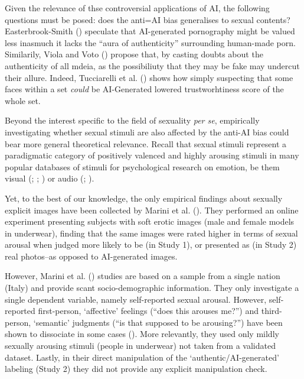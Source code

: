 \documentclass[
  jou,
  floatsintext,
  longtable,
  nolmodern,
  notxfonts,
  notimes,
  colorlinks=true,linkcolor=blue,citecolor=blue,urlcolor=blue]{apa7}
\begin{document}
Given the relevance of thse controversial applications of AI, the
following questions must be posed: does the anti=AI bias generalises to
sexual contents? Easterbrook-Smith
() speculate that
AI-generated pornography might be valued less inasmuch it lacks the
``aura of authenticity'' surrounding human-made porn. Similarily, Viola
and Voto () propose that, by
casting doubts about the authenticity of all mdeia, as the possibiliuty
that they may be fake may undercut their allure. Indeed, Tucciarelli et
al. () shows how simply
suspecting that some faces within a set \emph{could} be AI-Generated
lowered trustworhtiness score of the whole set.

Beyond the interest specific to the field of sexuality \emph{per se},
empirically investigating whether sexual stimuli are also affected by
the anti-AI bias could bear more general theoretical relevance. Recall
that sexual stimuli represent a paradigmatic category of positively
valenced and highly arousing stimuli in many popular databases of
stimuli for psychological research on emotion, be them visual
(;
;
) or audio
(;
).

Yet, to the best of our knowledge, the only empirical findings about
sexually explicit images have been collected by Marini et al.
(). They performed an online
experiment presenting subjects with soft erotic images (male and female
models in underwear), finding that the same images were rated higher in
terms of sexual arousal when judged more likely to be (in Study 1), or
presented as (in Study 2) real photos--as opposed to AI-generated
images.

However, Marini et al. () studies are
based on a sample from a single nation (Italy) and provide scant
socio-demographic information. They only investigate a single dependent
variable, namely self-reported sexual arousal. However, self-reported
first-person, `affective' feelings (``does this arouses me?'') and
third-person, `semantic' judgments (``is that supposed to be
arousing?'') have been shown to dissociate in some cases
(). More
relevantly, they used only mildly sexually arousing stimuli (people in
underwear) not taken from a validated dataset. Lastly, in their direct
manipulation of the `authentic/AI-generated' labeling (Study 2) they did
not provide any explicit manipulation check.
\end{document}
